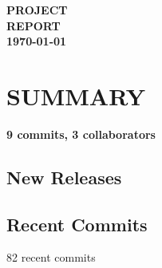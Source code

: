 \documentclass[11pt,a4paper]{full-example-report}
\begin{document}
\thispagestyle{empty} 
\begin{center}
    \vspace*{6cm}
    {\fontsize{38}{44}\selectfont \bfseries \color{purp} PROJECT} \\[0.2cm]
    {\fontsize{38}{44}\selectfont \bfseries \color{purp} REPORT} \\[0.6cm]
    {\fontsize{18}{22}\selectfont \bfseries \today}
\end{center}
\clearpage

\section*{{\fontsize{32}{36}\selectfont \bfseries \color{purp} SUMMARY}}
\vspace{-0.3cm}
{\large \bfseries 9 commits, 3 collaborators}


\subsection*{{\fontsize{20}{24}\selectfont \color{black} New Releases}}
\vspace{-0.2cm}




\subsection*{{\fontsize{20}{24}\selectfont \color{black} Recent Commits}}
\vspace{-0.2cm}


{\small 82 recent commits}
\end{document}
